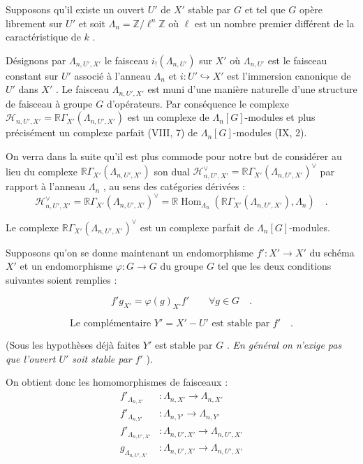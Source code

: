\documentclass[11pt]{article}
\DeclareMathOperator{\Hom}{Hom}
\newcommand{\R}{\mathbb{R}}\newcommand{\RHomCore}{\mathbb{R}\mathrm{Hom}}
\providecommand{\Hom}{\operatorname{Hom}}
\providecommand{\R}{\mathrm R}
\providecommand{\La}{\Lambda}
\providecommand{\bZ}{\mathbb Z}
\providecommand{\Hom}{\operatorname{Hom}}
\begin{document}
Supposons qu'il existe un ouvert $U'$ de $X'$ stable par $G$ et tel que $G$ opère librement sur $U'$ et soit $\La_n = \bZ/\ell^n\bZ$ où $\ell$ est un nombre premier différent de la caractéristique de $k$ .

Désignons par $\La_{n,U',X'}$ le faisceau $i_!(\La_{n,U'})$ sur $X'$ où $\La_{n,U'}$ est le faisceau constant sur $U'$ associé à l'anneau $\La_n$ et $i : U' \hookrightarrow X'$ est l'immersion canonique de $U'$ dans $X'$ . Le faisceau $\La_{n,U',X'}$ est muni d'une manière naturelle d'une structure de faisceau à groupe $G$ d'opérateurs. Par conséquence le complexe $\mathcal{H}_{n,U',X'} = \R\Gamma_{X'}(\La_{n,U',X'})$ est un complexe de $\La_n[G]$-modules
et plus précisément un complexe parfait (VIII, 7) de $\La_n[G]$-modules (IX, 2).

On verra dans la suite qu'il est plus commode pour notre but de considérer au lieu du complexe $\R\Gamma_{X'}(\La_{n,U',X'})$ son dual $\mathcal{H}_{n,U',X'}^\vee = \R\Gamma_{X'}(\La_{n,U',X'})^\vee$ par rapport à l'anneau $\La_n$ , au sens des catégories dérivées :
\[
\mathcal{H}_{n,U',X'}^\vee = \R\Gamma_{X'}(\La_{n,U',X'})^\vee = \R\Hom_{\La_n}(\R\Gamma_{X'}(\La_{n,U',X'}), \La_n) \quad .
\]

Le complexe $\R\Gamma_{X'}(\La_{n,U',X'})^\vee$ est un complexe parfait de $\La_n[G]$-modules.

Supposons qu'on se donne maintenant un endomorphisme $f' : X' \to X'$ du schéma $X'$ et un endomorphisme $\varphi : G \to G$ du groupe $G$ tel que les deux conditions suivantes soient remplies :

\begin{equation}\tag{1.1}
f' g_{X'} = \varphi(g)_{X'} f' \qquad \forall g \in G \quad .
\end{equation}

\begin{equation}\tag{1.2}
\text{Le complémentaire } Y' = X' - U' \text{ est stable par } f' \quad .
\end{equation}

(Sous les hypothèses déjà faites $Y'$ est stable par $G$ . \emph{En général on n'exige pas que l'ouvert $U'$ soit stable par $f'$} ).

On obtient donc les homomorphismes de faisceaux :
\begin{align*}
f'_{\La_{n,X'}} &: \La_{n,X'} \longrightarrow \La_{n,X'} \\
f'_{\La_{n,Y'}} &: \La_{n,Y'} \longrightarrow \La_{n,Y'} \\
f'_{\La_{n,U',X'}} &: \La_{n,U',X'} \longrightarrow \La_{n,U',X'} \\
g_{\La_{n,U',X'}} &: \La_{n,U',X'} \longrightarrow \La_{n,U',X'}
\end{align*}
\end{document}

